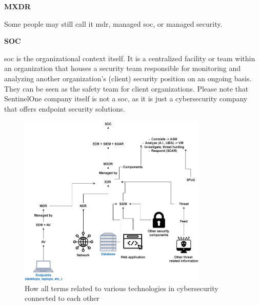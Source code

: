 \begin{multicols}{2}
      \textbf{MXDR}

      Some people may still call it \acrshort{mdr}, managed \acrshort{soc}, or managed security.

      \textbf{SOC}

      \acrshort{soc} is the organizational context itself. It is a centralized facility or team within an organization that houses a
      security team responsible for monitoring and analyzing another organization's (client) security position on an ongoing basis. They
      can be seen as the safety team for client organizations. Please note that SentinelOne company itself is not a \acrshort{soc}, as it
      is just a cybersecurity company that offers endpoint security solutions.

\end{multicols}

\begin{figure}[htbp]
      \centering
      \includegraphics[width=0.8\textwidth]{Figures/XDR.jpg}
      \caption{How all terms related to various technologies in cybersecurity connected to each other}
      \label{fig:xdr}
\end{figure}

